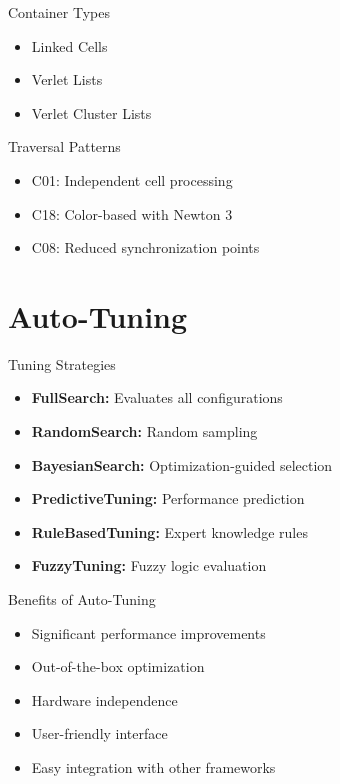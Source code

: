 \documentclass[
	10pt,
	t		%
]{beamer}
\begin{document}
\begin{frame}{Container Types}
    \begin{center}
    \end{center}
    \begin{itemize}
        \item Linked Cells
        \item Verlet Lists
        \item Verlet Cluster Lists
    \end{itemize}
\end{frame}

\begin{frame}{Traversal Patterns}
    \begin{center}
    \end{center}
    \begin{itemize}
        \item C01: Independent cell processing
        \item C18: Color-based with Newton 3
        \item C08: Reduced synchronization points
    \end{itemize}
\end{frame}

\section{Auto-Tuning}

\begin{frame}{Tuning Strategies}
    \begin{itemize}
        \item \textbf{FullSearch:} Evaluates all configurations
        \item \textbf{RandomSearch:} Random sampling
        \item \textbf{BayesianSearch:} Optimization-guided selection
        \item \textbf{PredictiveTuning:} Performance prediction
        \item \textbf{RuleBasedTuning:} Expert knowledge rules
        \item \textbf{FuzzyTuning:} Fuzzy logic evaluation
    \end{itemize}
\end{frame}

\begin{frame}{Benefits of Auto-Tuning}
    \begin{itemize}
        \item Significant performance improvements
        \item Out-of-the-box optimization
        \item Hardware independence
        \item User-friendly interface
        \item Easy integration with other frameworks
    \end{itemize}
\end{frame}
\end{document}
